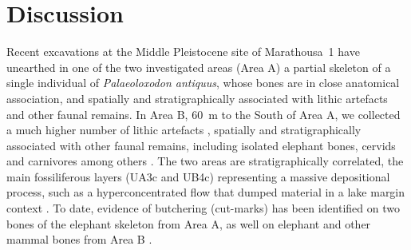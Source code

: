 \documentclass[preprint,authoryear,times]{elsarticle} %
\begin{document}


\section{Discussion}

Recent excavations at the Middle Pleistocene site of Marathousa~1 have unearthed in one of the two investigated areas (Area A) a partial skeleton of a single individual of \emph{Palaeoloxodon antiquus}, whose bones are in close anatomical association, and spatially and stratigraphically associated with lithic artefacts and other faunal remains. In Area B, 60~m to the South of Area A, we collected a much higher number of lithic artefacts \citep{Tourloukis}, spatially and stratigraphically associated with other faunal remains, including isolated elephant bones, cervids and carnivores among others \citep{Konidaris}. The two areas are stratigraphically correlated, the main fossiliferous layers (UA3c and UB4c) representing a massive depositional process, such as a hyperconcentrated flow that dumped material in a lake margin context \citep{Karkanas}. To date, evidence of butchering (cut-marks) has been identified on two bones of the elephant skeleton from Area A, as well on elephant and other mammal bones from Area B \citep{Konidaris}.
\end{document}
